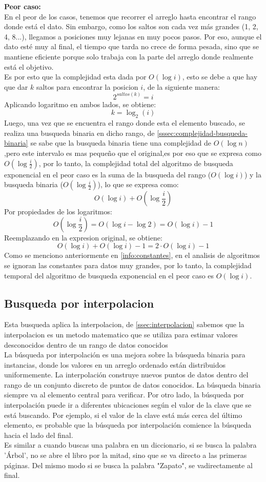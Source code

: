 \documentclass[9pt,letterpaper,onecolumn]{rho-class/rho}
\begin{document}
    \textbf{Peor caso:}\\
    En el peor de los casos, tenemos que recorrer el arreglo hasta encontrar el rango donde 
    está el dato. Sin embargo, como los saltos son cada vez más grandes (1, 2, 4, 8...), 
    llegamos a posiciones muy lejanas en muy pocos pasos. Por eso, aunque el dato esté muy 
    al final, el tiempo que tarda no crece de forma pesada, sino que se mantiene eficiente
    porque solo trabaja con la parte del arreglo donde realmente está el objetivo.\\
    Es por esto que la complejidad esta dada por $O(\log i)$, esto se debe a que hay que dar
    $k$ saltos para encontrar la posicion $i$, de la siguiente manera:
    $$2^{saltos(k)}=i$$
    Aplicando logaritmo en ambos lados, se obtiene:
    $$k=\log_2(i)$$
    Luego, una vez que se encuentra el rango donde esta el elemento buscado, se realiza
    una busqueda binaria en dicho rango, de \ref{sssec:complejidad-busqueda-binaria} se 
    sabe que la busqueda binaria tiene una complejidad de $O(\log n)$,pero este intervalo
    es mas pequeño que el original,es por eso que se expresa como $O(\log \frac{i}{2})$, 
    por lo tanto, la complejidad total del algoritmo de busqueda exponencial en el peor caso 
    es la suma
    de la busqueda del rango ($O(\log i)$) y la busqueda binaria ($O(\log \frac{i}{2})$), 
    lo que se expresa como:
    $$O(\log i) + O(\log \frac{i}{2})$$
    Por propiedades de los logaritmos:
    $$O(\log \frac{i}{2})=O(\log i - \log 2)=O(\log i)-1$$
    Reemplazando en la expresion original, se obtiene:
    $$O(\log i) +O(\log i) - 1 = 2 \cdot O(\log i) - 1$$
    Como se menciono anteriormente en \ref{info:constantes}, en el analisis de algoritmos 
    se ignoran las constantes para datos muy grandes, por lo tanto, la complejidad temporal
    del algoritmo de busqueda exponencial en el peor caso es $O(\log i)$.

\subsection{Busqueda por interpolacion}
Esta busqueda aplica la interpolacion, de \ref{ssec:interpolacion} sabemos que la interpolacion es un metodo matematico que se utiliza
para estimar valores desconocidos dentro de un rango de datos conocidos\\
La búsqueda por interpolación es una mejora sobre la búsqueda binaria para instancias, donde los valores en un arreglo ordenado están 
distribuidos uniformemente. La interpolación construye nuevos puntos de datos dentro del rango de un conjunto discreto de puntos de datos 
conocidos. La búsqueda binaria siempre va al elemento central para verificar. Por otro lado, la búsqueda por interpolación puede ir a diferentes 
ubicaciones según el valor de la clave que se está buscando. Por ejemplo, si el valor de la clave está más cerca del último elemento, 
es probable que la búsqueda por interpolación comience la búsqueda hacia el lado del final.\\
Es similar a cuando buscas una palabra en un diccionario, si se busca la palabra 'Árbol', no se abre el libro por la mitad, sino que se va
directo a las primeras páginas. Del mismo modo si se busca la palabra "Zapato", se vadirectamente al final.
\end{document}
